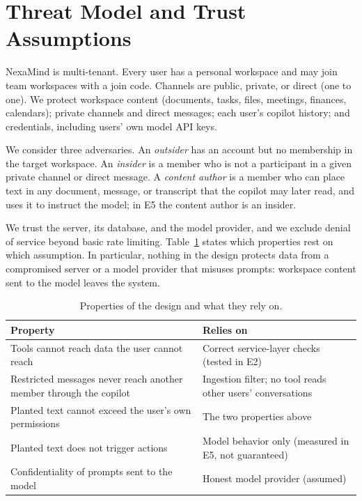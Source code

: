 \documentclass[conference]{IEEEtran}
\begin{document}
\section{Threat Model and Trust Assumptions}
\label{sec:threat}

NexaMind is multi-tenant. Every user has a personal workspace and may join team workspaces with a join code. Channels are public, private, or direct (one to one). We protect workspace content (documents, tasks, files, meetings, finances, calendars); private channels and direct messages; each user's copilot history; and credentials, including users' own model API keys.

We consider three adversaries. An \emph{outsider} has an account but no membership in the target workspace. An \emph{insider} is a member who is not a participant in a given private channel or direct message. A \emph{content author} is a member who can place text in any document, message, or transcript that the copilot may later read, and uses it to instruct the model; in E5 the content author is an insider.

We trust the server, its database, and the model provider, and we exclude denial of service beyond basic rate limiting. Table~\ref{tab:trust} states which properties rest on which assumption. In particular, nothing in the design protects data from a compromised server or a model provider that misuses prompts: workspace content sent to the model leaves the system.

\begin{table}[t]
\centering
\caption{Properties of the design and what they rely on.}
\label{tab:trust}
\small
\begin{tabular}{@{}p{3.6cm}p{4.2cm}@{}}
\toprule
Property & Relies on \\
\midrule
Tools cannot reach data the user cannot reach & Correct service-layer checks (tested in E2) \\
Restricted messages never reach another member through the copilot & Ingestion filter; no tool reads other users' conversations \\
Planted text cannot exceed the user's own permissions & The two properties above \\
Planted text does not trigger actions & Model behavior only (measured in E5, not guaranteed) \\
Confidentiality of prompts sent to the model & Honest model provider (assumed) \\
\bottomrule
\end{tabular}
\end{table}
\end{document}
